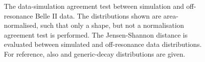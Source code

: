 \begin{figure}[htbp!]
{    }
    \caption{\label{fig:continuum_features_datamc_agreement} The data-simulation agreement test between \epem\ra\qqbar simulation and off-resonance Belle II data.
    The distributions shown are area-normalised, such that only a shape, but not a normalisation agreement test is performed.
    The Jensen-Shannon distance is evaluated between simulated \epem\ra\qqbar and off-resonance data distributions.
    For reference, also \BtoXsgamma and generic-\BB decay distributions are given.}
\end{figure}